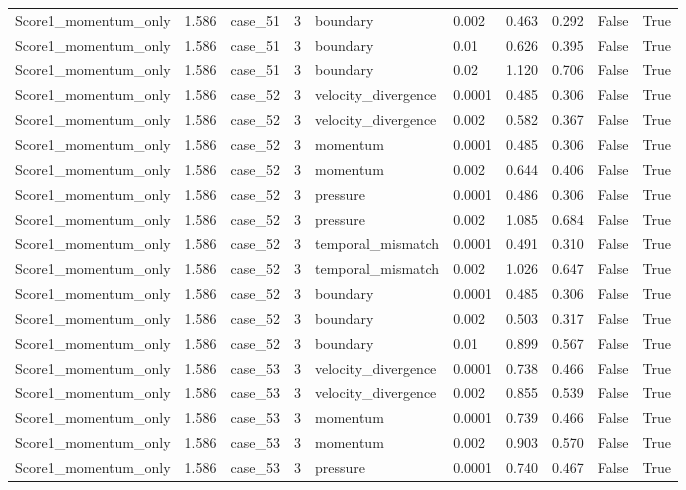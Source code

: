 \begin{longtable}{llllllllll}
Score1\_momentum\_only & 1.586 & case\_51 & 3 & boundary & 0.002 & 0.463 & 0.292 & False & True \\
Score1\_momentum\_only & 1.586 & case\_51 & 3 & boundary & 0.01 & 0.626 & 0.395 & False & True \\
Score1\_momentum\_only & 1.586 & case\_51 & 3 & boundary & 0.02 & 1.120 & 0.706 & False & True \\
Score1\_momentum\_only & 1.586 & case\_52 & 3 & velocity\_divergence & 0.0001 & 0.485 & 0.306 & False & True \\
Score1\_momentum\_only & 1.586 & case\_52 & 3 & velocity\_divergence & 0.002 & 0.582 & 0.367 & False & True \\
Score1\_momentum\_only & 1.586 & case\_52 & 3 & momentum & 0.0001 & 0.485 & 0.306 & False & True \\
Score1\_momentum\_only & 1.586 & case\_52 & 3 & momentum & 0.002 & 0.644 & 0.406 & False & True \\
Score1\_momentum\_only & 1.586 & case\_52 & 3 & pressure & 0.0001 & 0.486 & 0.306 & False & True \\
Score1\_momentum\_only & 1.586 & case\_52 & 3 & pressure & 0.002 & 1.085 & 0.684 & False & True \\
Score1\_momentum\_only & 1.586 & case\_52 & 3 & temporal\_mismatch & 0.0001 & 0.491 & 0.310 & False & True \\
Score1\_momentum\_only & 1.586 & case\_52 & 3 & temporal\_mismatch & 0.002 & 1.026 & 0.647 & False & True \\
Score1\_momentum\_only & 1.586 & case\_52 & 3 & boundary & 0.0001 & 0.485 & 0.306 & False & True \\
Score1\_momentum\_only & 1.586 & case\_52 & 3 & boundary & 0.002 & 0.503 & 0.317 & False & True \\
Score1\_momentum\_only & 1.586 & case\_52 & 3 & boundary & 0.01 & 0.899 & 0.567 & False & True \\
Score1\_momentum\_only & 1.586 & case\_53 & 3 & velocity\_divergence & 0.0001 & 0.738 & 0.466 & False & True \\
Score1\_momentum\_only & 1.586 & case\_53 & 3 & velocity\_divergence & 0.002 & 0.855 & 0.539 & False & True \\
Score1\_momentum\_only & 1.586 & case\_53 & 3 & momentum & 0.0001 & 0.739 & 0.466 & False & True \\
Score1\_momentum\_only & 1.586 & case\_53 & 3 & momentum & 0.002 & 0.903 & 0.570 & False & True \\
Score1\_momentum\_only & 1.586 & case\_53 & 3 & pressure & 0.0001 & 0.740 & 0.467 & False & True \\

\end{longtable}
